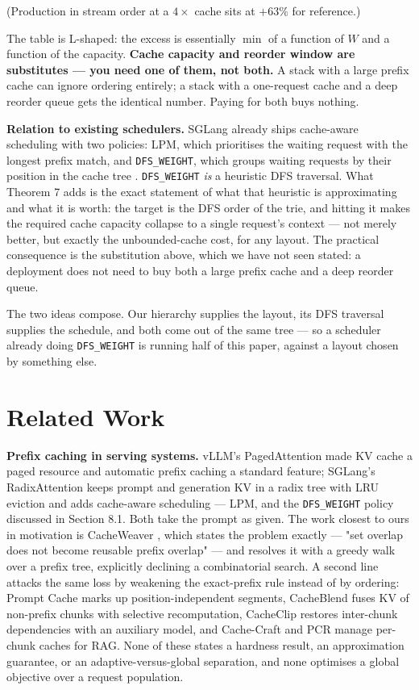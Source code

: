\documentclass[11pt]{article}
\theoremstyle{plain}
\begin{document}
(Production in stream order at a $4\times$ cache sits at $+63\%$ for reference.)

The table is L-shaped: the excess is essentially $\min$ of a function of $W$ and a function of the capacity. \textbf{Cache capacity and reorder window are substitutes --- you need one of them, not both.} A stack with a large prefix cache can ignore ordering entirely; a stack with a one-request cache and a deep reorder queue gets the identical number. Paying for both buys nothing.

\textbf{Relation to existing schedulers.} SGLang already ships cache-aware scheduling with two policies: LPM, which prioritises the waiting request with the longest prefix match, and \texttt{DFS\_WEIGHT}, which groups waiting requests by their position in the cache tree \cite{SGL}. \texttt{DFS\_WEIGHT} \emph{is} a heuristic DFS traversal. What Theorem 7 adds is the exact statement of what that heuristic is approximating and what it is worth: the target is the DFS order of the trie, and hitting it makes the required cache capacity collapse to a single request's context --- not merely better, but exactly the unbounded-cache cost, for any layout. The practical consequence is the substitution above, which we have not seen stated: a deployment does not need to buy both a large prefix cache and a deep reorder queue.

The two ideas compose. Our hierarchy supplies the layout, its DFS traversal supplies the schedule, and both come out of the same tree --- so a scheduler already doing \texttt{DFS\_WEIGHT} is running half of this paper, against a layout chosen by something else.


\section{Related Work}

\textbf{Prefix caching in serving systems.} vLLM's PagedAttention \cite{KWO23} made KV cache a paged resource and automatic prefix caching a standard feature; SGLang's RadixAttention \cite{SGL} keeps prompt and generation KV in a radix tree with LRU eviction and adds cache-aware scheduling --- LPM, and the \texttt{DFS\_WEIGHT} policy discussed in Section 8.1. Both take the prompt as given. The work closest to ours in motivation is CacheWeaver \cite{CW26}, which states the problem exactly --- "set overlap does not become reusable prefix overlap" --- and resolves it with a greedy walk over a prefix tree, explicitly declining a combinatorial search. A second line attacks the same loss by weakening the exact-prefix rule instead of by ordering: Prompt Cache \cite{GIM24} marks up position-independent segments, CacheBlend \cite{CB24} fuses KV of non-prefix chunks with selective recomputation, CacheClip \cite{CC25} restores inter-chunk dependencies with an auxiliary model, and Cache-Craft \cite{CCR25} and PCR \cite{PCR26} manage per-chunk caches for RAG. None of these states a hardness result, an approximation guarantee, or an adaptive-versus-global separation, and none optimises a global objective over a request population.
\end{document}
